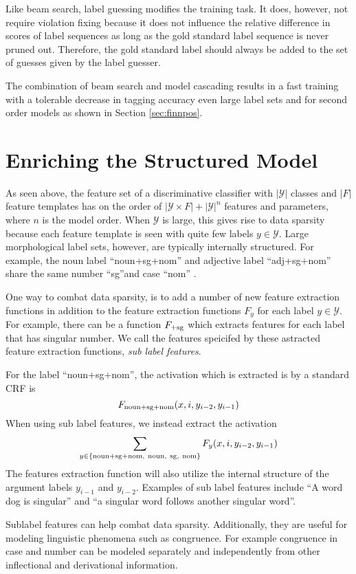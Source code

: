 Like beam search, label guessing modifies the training task. It does,
however, not require violation fixing because it does not influence
the relative difference in scores of label sequences as long as the
gold standard label sequence is never pruned out. Therefore, the gold
standard label should always be added to the set of guesses given by
the label guesser.

The combination of beam search and model cascading results in a fast
training with a tolerable decrease in tagging accuracy even large
label sets and for second order models as shown in Section
\ref{sec:finnpos}.

\section{Enriching the Structured Model}\label{sec:sub-labels}
As seen above, the feature set of a discriminative classifier with
$|\mathcal{Y}|$ classes and $|F|$ feature templates has on the order
of $|\mathcal{Y}\times F| + |\mathcal{Y}|^n$ features and parameters,
where $n$ is the model order. When $\mathcal{Y}$ is large, this gives
rise to data sparsity because each feature template is seen with quite
few labels $y \in \mathcal{Y}$. Large morphological label sets,
however, are typically internally structured. For example, the noun
label ``noun+sg+nom'' and adjective label ``adj+sg+nom'' share the
same number ``sg''and case ``nom'' .

One way to combat data sparsity, is to add a number of new feature
extraction functions in addition to the feature extraction functions
$F_y$ for each label $y\in \mathcal{Y}$. For example, there can be a
function $F_{{\rm +sg}}$ which extracts features for each label that
has singular number. We call the features speicifed by these astracted
feature extraction functions, {\it sub label features}.

For the label ``noun+sg+nom'', the activation which is extracted is by a standard CRF is
$$F_{\rm noun+sg+nom}(x, i, y_{i-2}, y_{i-1})$$
When using sub label features, we instead extract the activation
$$\sum_{y \in \{{\rm noun+sg+nom,\ noun,\ sg,\ nom\}}} F_{y}(x, i, y_{i-2}, y_{i-1})$$
The features extraction function will also utilize the internal
structure of the argument labels $y_{i-1}$ and $y_{i-2}$. Examples of
sub label features include ``A word dog is singular'' and ``a singular
word follows another singular word''.

Sublabel features can help combat data sparsity. Additionally, they
are useful for modeling linguistic phenomena such as congruence. For
example congruence in case and number can be modeled separately and
independently from other inflectional and derivational information.

